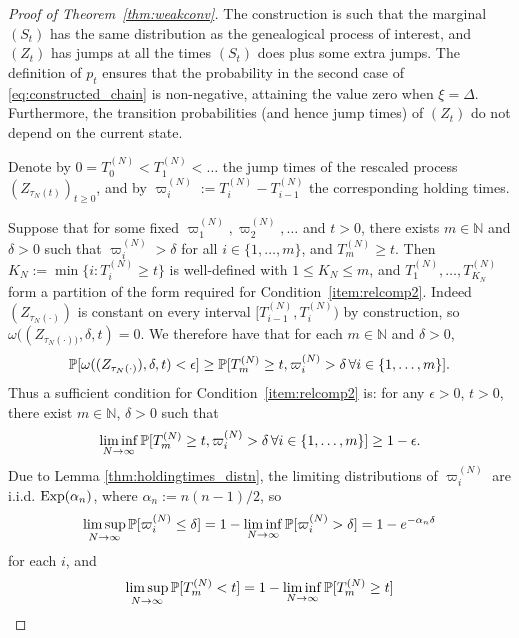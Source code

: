 \begin{proof}[Proof of Theorem~\ref{thm:weakconv}]
The construction is such that the marginal $(S_t)$ has the same distribution as the genealogical process of interest, and $(Z_t)$ has jumps at all the times $(S_t)$ does plus some extra jumps. The definition of $p_t$ ensures that the probability in the second case of \eqref{eq:constructed_chain} is non-negative, attaining the value zero when $\xi=\Delta$.
Furthermore, the transition probabilities (and hence jump times) of $(Z_t)$ do not depend on the current state.

Denote by $0=T_0^{(N)}<T_1^{(N)}<\dots$ the jump times of the rescaled process $(Z_{\tau_N(t)})_{t\geq0}$, and by $\varpi_i^{(N)} := T_i^{(N)} - T_{i-1}^{(N)}$ the corresponding holding times.

Suppose that for some fixed $\varpi_1^{(N)}, \varpi_2^{(N)}, \dots$ and $t>0$, there exists $m \in \mathbb{N}$ and $\delta >0$ such that
$\varpi_i^{(N)} > \delta$ for all $i\in \{1,\dots,m\}$, and
$T_m^{(N)} \geq t$.
Then
$K_N := \min\{i : T_i^{(N)} \geq t\}$
is well-defined with $1\leq K_N \leq m$,
and $T_1^{(N)} , \dots, T_{K_N}^{(N)}$ form a partition of the form required for Condition~\ref{item:relcomp2}.
Indeed $(Z_{\tau_N(\cdot)})$ is constant on every interval $[ T_{i-1}^{(N)} , T_i^{(N)} )$ by construction, so $\omega( (Z_{\tau_N(\cdot))} , \delta, t ) = 0$. 
We therefore have that
for each $m \in \mathbb{N}$ and $\delta >0$,
\begin{equation*}
\mathbb{P}[ \omega( (Z_{\tau_N(\cdot)}) , \delta, t ) < \epsilon ]
\geq \mathbb{P}[ T_m^{(N)} \geq t, \varpi_i^{(N)} > \delta \,\forall i\in \{1,\dots,m\} ] .
\end{equation*}
Thus a sufficient condition for Condition~\ref{item:relcomp2} is: 
for any $\epsilon>0$, $t>0$, there exist $m\in\mathbb{N}$, $\delta>0$ such that
\begin{equation}\label{eq:condition2b}
\liminf_{N\to\infty} 
        \mathbb{P}[ T_m^{(N)} \geq t, \varpi_i^{(N)} > \delta \,\forall i\in \{1,\dots,m\} ]
\geq 1-\epsilon .
\end{equation}
Due to Lemma \ref{thm:holdingtimes_distn}, the limiting distributions of $\varpi_i^{(N)}$ are i.i.d. $\operatorname{Exp}(\alpha_n)$, where $\alpha_n := n(n-1)/2$, so
\begin{equation*}
\limsup_{N\to\infty} \mathbb{P}[ \varpi_i^{(N)} \leq \delta ] 
= 1- \liminf_{N\to\infty} \mathbb{P}[ \varpi_i^{(N)} > \delta ] 
= 1- e^{-\alpha_n \delta}
\end{equation*}
for each $i$, and
\begin{align*}
\limsup_{N\to\infty} \Prob[ T_m^{(N)} < t ]
&= 1- \liminf_{N\to\infty} \Prob[ T_m^{(N)} \geq t ] \\

\end{align*}
\end{proof}
